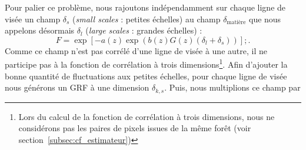 Pour palier ce problème, nous rajoutons indépendamment sur chaque ligne de visée un champ $\delta_s$ (\emph{small scales} : petites échelles) au champ $\delta_{\mathrm{matière}}$ que nous appelons désormais $\delta_{l}$ (\emph{large scales} : grandes échelles) :
\begin{equation}
  \label{eq:fgpa3}
  F = \exp\left[ - a(z) \exp(b(z) G(z) (\delta_l + \delta_s))\right] ;.
\end{equation}
Comme ce champ n'est pas corrélé d'une ligne de visée à une autre, il ne participe pas à la fonction de corrélation à trois dimensions\footnote{Lors du calcul de la fonction de corrélation à trois dimensions, nous ne considérons pas les paires de pixels issues de la même forêt (voir section~\ref{subsec:cf_estimateur})}.
Afin d'ajouter la bonne quantité de fluctuations aux petites échelles, pour chaque ligne de visée nous générons un GRF à une dimension $\delta_{k,s}$.
Puis, nous multiplions ce champ par
